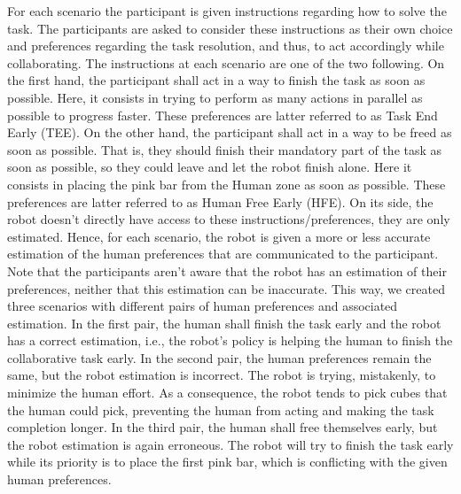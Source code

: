 For each scenario the participant is given instructions regarding how to solve the task. The participants are asked to consider these instructions as their own choice and preferences regarding the task resolution, and thus, to act accordingly while collaborating. The instructions at each scenario are one of the two following.
On the first hand, the participant shall act in a way to finish the task as soon as possible. Here, it consists in trying to perform as many actions in parallel as possible to progress faster. These preferences are latter referred to as Task End Early (TEE).
On the other hand, the participant shall act in a way to be freed as soon as possible. That is, they should finish their mandatory part of the task as soon as possible, so they could leave and let the robot finish alone. Here it consists in placing the pink bar from the Human zone as soon as possible. These preferences are latter referred to as Human Free Early (HFE).
On its side, the robot doesn't directly have access to these instructions/preferences, they are only estimated. Hence, for each scenario, the robot is given a more or less accurate estimation of the human preferences that are communicated to the participant. Note that the participants aren't aware that the robot has an estimation of their preferences, neither that this estimation can be inaccurate.
This way, we created three scenarios with different pairs of human preferences and associated estimation. In the first pair, the human shall finish the task early and the robot has a correct estimation, i.e., the robot's policy is helping the human to finish the collaborative task early. In the second pair, the human preferences remain the same, but the robot estimation is incorrect. The robot is trying, mistakenly, to minimize the human effort. As a consequence, the robot tends to pick cubes that the human could pick, preventing the human from acting and making the task completion longer. In the third pair, the human shall free themselves early, but the robot estimation is again erroneous. The robot will try to finish the task early while its priority is to place the first pink bar, which is conflicting with the given human preferences.

